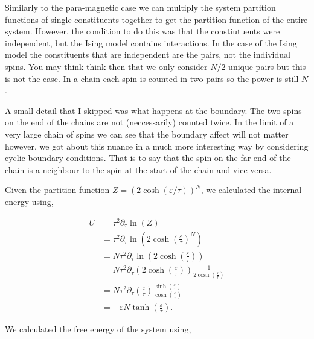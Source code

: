 \documentclass[a4paper, twocolumn]{article}
\begin{document}
Similarly to the para-magnetic case we can multiply the system %
partition functions of single constituents together to get the %
partition function of the entire system. However, the condition %
to do this was that the constiutuents were independent, but the %
Ising model contains interactions. In the case of the Ising model %
the constituents that are independent are the pairs, not the %
individual spins. You may think think then that we only consider %
\(N / 2\) unique pairs but this is not the case. In a chain each %
spin is counted in two pairs so the power is still \(N\). 


A small detail that I skipped was what happens at the boundary. %
The two spins on the end of the chains are not (neccessarily) %
counted twice. In the limit of a very large chain of spins we %
can see that the boundary affect will not matter however, we %
got about this nuance in a much more interesting way by considering %
cyclic boundary conditions. That is to say that the spin on the %
far end of the chain is a neighbour to the spin at the start of the %
chain and vice versa. 


Given the partition function \(Z = (2\cosh(\varepsilon / \tau))^{N}\), we 
calculated the internal energy using,

\begin{align}
    U &= \tau^{2}\partial_{\tau}\ln(Z)\label{EQN1}\\
        &= \tau^{2}\partial_{\tau}
            \ln\left(2\cosh\left(\frac{\varepsilon}{\tau}\right)^{N}\right)
            \nonumber \\
        &= N\tau^{2}\partial_{\tau}
            \ln\left(2\cosh\left(\frac{\varepsilon}{\tau}\right)\right)
            \nonumber \\
        &= N\tau^{2}\partial_{\tau}
            \left(2\cosh\left(\frac{\varepsilon}{\tau}\right)\right)
            \frac{1}{2\cosh\left(\frac{\varepsilon}{\tau}\right)}
            \nonumber \\
        &= N\tau^{2}\partial_{\tau}\left(\frac{\varepsilon}{\tau}\right)
            \frac{\sinh\left(\frac{\varepsilon}{\tau}\right)}
            {\cosh\left(\frac{\varepsilon}{\tau}\right)}\nonumber \\
        &= -\varepsilon N\tanh\left(\frac{\varepsilon}{\tau}\right)
    \label{eqn:2}.
\end{align}

We calculated the free energy of the system using,
\end{document}
